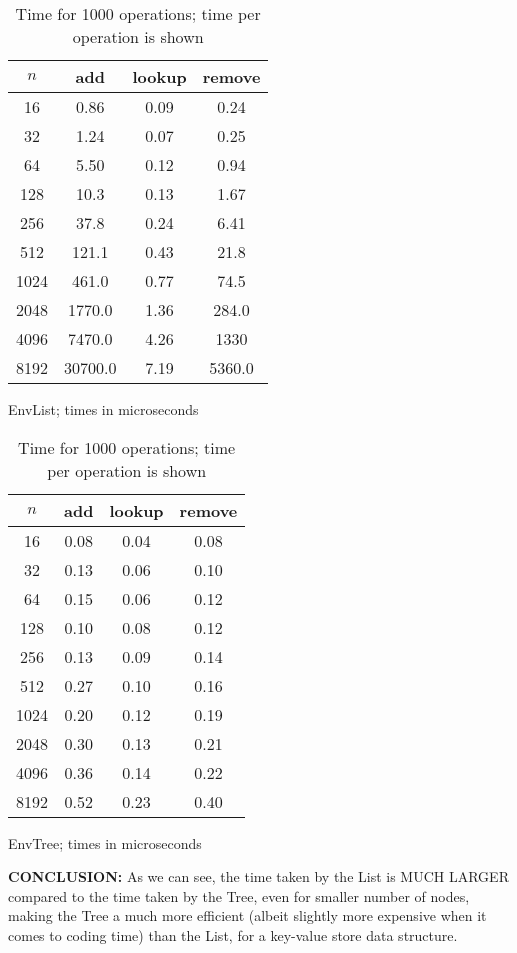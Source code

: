 \documentclass[a4paper,11pt]{article}
\begin{document}
\begin{table}[ht]
  \begin{subtable}{0.5\textwidth}
    \centering
    \begin{tabular}{cccc}
      \toprule
      $n$ & add & lookup & remove \\
      \midrule
      16    & 0.86    & 0.09    & 0.24    \\
      32    & 1.24    & 0.07    & 0.25    \\
      64    & 5.50    & 0.12    & 0.94    \\
      128   & 10.3   & 0.13    & 1.67    \\
      256   & 37.8   & 0.24    & 6.41    \\
      512   & 121.1  & 0.43    & 21.8   \\
      1024  & 461.0  & 0.77    & 74.5   \\
      2048  & 1770.0 & 1.36    & 284.0  \\
      4096  & 7470.0 & 4.26    & 1330 \\
      8192  & 30700.0& 7.19    & 5360.0 \\
      \bottomrule
    \end{tabular}
    \caption{EnvList; times in microseconds}
  \end{subtable}%
  \begin{subtable}{0.5\textwidth}
    \centering
    \begin{tabular}{cccc}
      \toprule
      $n$ & add & lookup & remove \\
      \midrule
      16    & 0.08    & 0.04    & 0.08    \\
      32    & 0.13    & 0.06    & 0.10    \\
      64    & 0.15    & 0.06    & 0.12    \\
      128   & 0.10    & 0.08    & 0.12    \\
      256   & 0.13    & 0.09    & 0.14    \\
      512   & 0.27    & 0.10    & 0.16    \\
      1024  & 0.20    & 0.12    & 0.19    \\
      2048  & 0.30    & 0.13    & 0.21    \\
      4096  & 0.36    & 0.14    & 0.22    \\
      8192  & 0.52    & 0.23    & 0.40    \\
      \bottomrule
    \end{tabular}
    \caption{EnvTree; times in microseconds}
  \end{subtable}
  \caption{Time for 1000 operations; time per operation is shown}
\end{table}

\textbf{CONCLUSION:} As we can see, the time taken by the List is MUCH LARGER compared to the time taken by the Tree, even for smaller number of nodes, making the Tree a much more efficient (albeit slightly more expensive when it comes to coding time) than the List, for a key-value store data structure.
\end{document}
